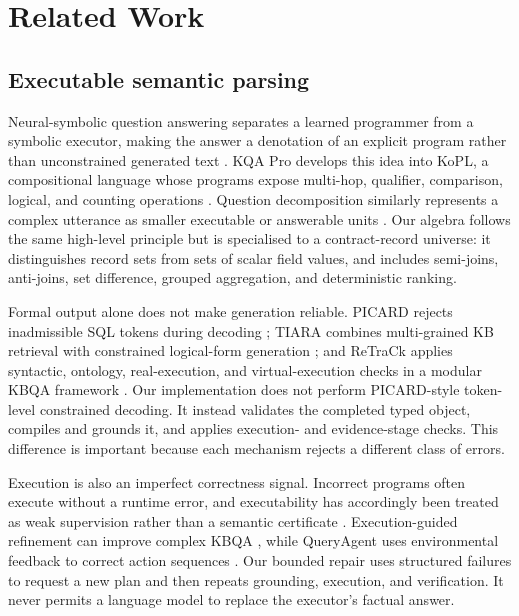 \section{Related Work}
\label{sec:related}

\subsection{Executable semantic parsing}

Neural-symbolic question answering separates a learned programmer from a symbolic executor,
making the answer a denotation of an explicit program rather than unconstrained generated text
\citep{liang-etal-2017-nsm}.  KQA Pro develops this idea into KoPL, a compositional language
whose programs expose multi-hop, qualifier, comparison, logical, and counting operations
\citep{cao-etal-2022-kqa}.  Question decomposition similarly represents a complex utterance as
smaller executable or answerable units \citep{wolfson-etal-2020-break}.  Our algebra follows the
same high-level principle but is specialised to a contract-record universe: it distinguishes
record sets from sets of scalar field values, and includes semi-joins, anti-joins, set
difference, grouped aggregation, and deterministic ranking.

Formal output alone does not make generation reliable.  PICARD rejects inadmissible SQL tokens
during decoding \citep{scholak-etal-2021-picard}; TIARA combines multi-grained KB retrieval with
constrained logical-form generation \citep{shu-etal-2022-tiara}; and ReTraCk applies syntactic,
ontology, real-execution, and virtual-execution checks in a modular KBQA framework
\citep{chen-etal-2021-retrack}.  Our implementation does not perform PICARD-style token-level
constrained decoding.  It instead validates the completed typed object, compiles and grounds it,
and applies execution- and evidence-stage checks.  This difference is important because each
mechanism rejects a different class of errors.

Execution is also an imperfect correctness signal.  Incorrect programs often execute without a
runtime error, and executability has accordingly been treated as weak supervision rather than a
semantic certificate \citep{wang-etal-2021-learning-executions}.  Execution-guided refinement
can improve complex KBQA \citep{guo-etal-2023-parse}, while QueryAgent uses environmental
feedback to correct action sequences \citep{huang-etal-2024-queryagent}.  Our bounded repair
uses structured failures to request a new plan and then repeats grounding, execution, and
verification.  It never permits a language model to replace the executor's factual answer.

